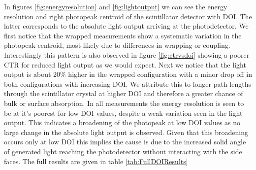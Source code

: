 In figures \ref{fig:energyresolution} and \ref{fig:lightoutput} we can see the energy resolution and right photopeak centroid of the scintillator detector with DOI. The latter corresponds to the absolute light output arriving at the photodetector. We first notice that the wrapped measurements show a systematic variation in the photopeak centroid, most likely due to differences in wrapping or coupling. Interestingly this pattern is also observed in figure \ref{fig:ctrvsdoi} showing a poorer CTR for reduced light output as we would expect. Next we notice that the light output is about 20\% higher in the wrapped configuration with a minor drop off in both configurations with increasing DOI. We attribute this to longer path lengths through the scintillator crystal at higher DOI and therefore a greater chance of bulk or surface absorption. In all measurements the energy resolution is seen to be at it's poorest for low DOI values, despite a weak variation seen in the light output. This indicates a broadening of the photopeak at low DOI values as no large change in the absolute light output is observed. Given that this broadening occurs only at low DOI this implies the cause is due to the increased solid angle of generated light reaching the photodetector without interacting with the side faces. The full results are given in table \ref{tab:FullDOIResults}